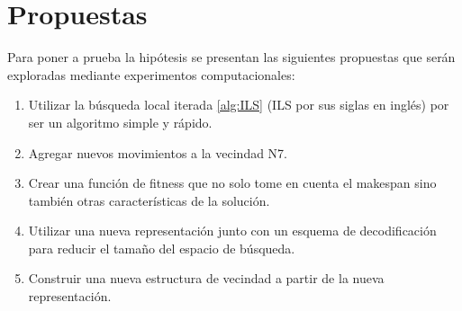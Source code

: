 \section{Propuestas}
Para poner a prueba la hipótesis se presentan las siguientes propuestas que serán exploradas mediante experimentos computacionales:
\begin{enumerate}
    \item Utilizar la búsqueda local iterada \ref{alg:ILS} (ILS por sus siglas en inglés) por ser un algoritmo simple y rápido.
\item Agregar nuevos movimientos a la vecindad N7.
\item Crear una función de fitness que no solo tome en  cuenta el makespan sino también otras características de la solución.
\item Utilizar una nueva representación junto con un esquema de decodificación para reducir el tamaño del espacio de búsqueda.
\item Construir una nueva estructura de vecindad a partir de la nueva representación.
\end{enumerate}
